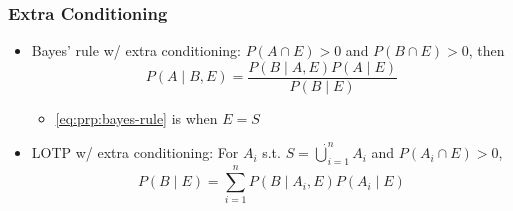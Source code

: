 \subsubsection*{Extra Conditioning}
\begin{itemize}
    \item Bayes' rule w/ extra conditioning: $P(A\cap E)>0$ and $P(B\cap E)>0$, then
    \begin{equation}
        P(A\mid B,E)=\frac{P(B\mid A,E)P(A\mid E)}{P(B\mid E)}
    \end{equation}
    \begin{itemize}
        \item \ref{eq:prp:bayes-rule} is when $E=S$
    \end{itemize}
    \item LOTP w/ extra conditioning: For $A_i$ s.t. $S=\dot{\bigcup}_{i=1}^nA_i$ and $P(A_i\cap E)>0$,
    \begin{equation}
        P(B\mid E)=\sum_{i=1}^nP(B\mid A_i,E)P(A_i\mid E)
    \end{equation}
\end{itemize}

